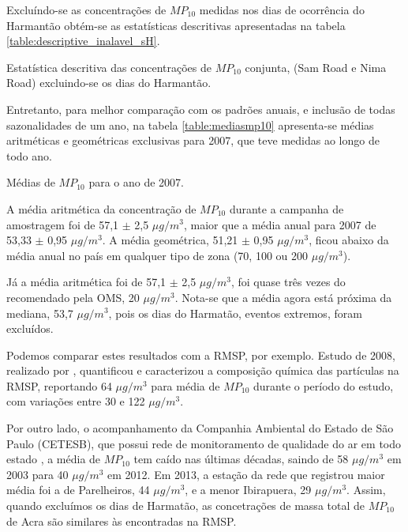 Excluíndo-se as concentrações de $MP_{10}$ medidas nos dias de ocorrência do 
Harmantão obtém-se as estatísticas descritivas apresentadas na tabela 
\ref{table:descriptive_inalavel_sH}.

\begin{table}[H]
  \centering
    
  \caption{Estatística descritiva das concentrações de $MP_{10}$ conjunta, 
           (Sam Road e Nima Road) excluindo-se os dias do Harmantão.
            \label{table:descriptive_inalavel_sH}}
\end{table}

Entretanto, para melhor comparação com os padrões anuais, e inclusão de todas 
sazonalidades de um ano, na tabela \ref{table:mediasmp10} apresenta-se médias 
aritméticas e geométricas exclusivas para 2007, que teve medidas ao longo de 
todo ano.

\begin{table}[H]
  \centering
  
  \caption{Médias de $MP_{10}$ para o ano de 2007. \label{table:mediasmp10}}
\end{table}

A média aritmética da concentração de $MP_{10}$ durante a campanha de amostragem 
foi de 57,1 $\pm$ 2,5 $\mu g/ m^3$, maior que a média anual para 2007 de 
53,33 $\pm$ 0,95 $\mu g/ m^3$. A média geométrica, 51,21 $\pm$ 0,95 $\mu g/ m^3$, 
ficou abaixo da média anual no país em qualquer tipo de zona 
(70, 100 ou 200 $\mu g/ m^3$). 

Já a média aritmética foi de 57,1 $\pm$ 2,5 $\mu g/ m^3$, foi quase três vezes 
do recomendado pela OMS, 20 $\mu g/m^3$. Nota-se que a média agora está próxima
da mediana, 53,7 $\mu g/ m^3$, pois os dias do Harmatão, eventos extremos, 
foram excluídos. 

Podemos comparar estes resultados com a RMSP, por exemplo. Estudo de 2008, 
realizado por \citet{souza2014}, quantificou e caracterizou a composição química
das partículas na RMSP, reportando 64 $\mu g / m^3$ para média de $MP_{10}$ 
durante o período do estudo, com variações entre 30 e 122 $\mu g / m^3$.

Por outro lado, o acompanhamento da Companhia Ambiental do Estado de São Paulo 
(CETESB), que possui rede de monitoramento de qualidade do ar em todo estado 
\citep{cetesb2014}, a média de $MP_{10}$ tem caído nas últimas décadas, saindo 
de 58 $\mu g / m^3$ em 2003 para 40 $\mu g / m^3$ em 2012. Em 2013, a estação da
rede que registrou maior média foi a de Parelheiros, 44 $\mu g / m^3$, e a menor 
Ibirapuera, 29 $\mu g / m^3$. Assim, quando excluímos os dias de Harmatão, 
as concetrações de massa total de $MP_{10}$ de Acra são similares às encontradas
na RMSP.

